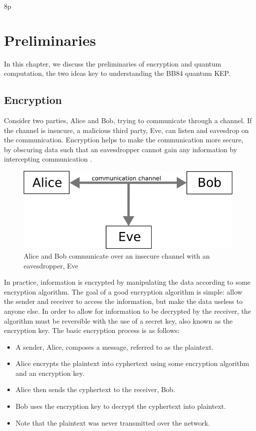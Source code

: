 8p\chapter{Preliminaries}
\label{chap:background}

In this chapter, we discuss the preliminaries of encryption and quantum computation, the two ideas key to understanding the BB84 quantum KEP.


\section{Encryption}
Consider two parties, Alice and Bob, trying to communicate through a channel.
If the channel is insucure, a malicious third party, Eve, can listen and eavesdrop on the communication.
Encryption helps to make the communication more secure, by obscuring data such that an eavesdropper cannot gain any information by intercepting communication \cite{encrypt}.

\begin{figure}[htp]
\centering
\includegraphics[scale=0.4]{images/classical_communication.png}
\caption{Alice and Bob communicate over an insecure channel with an eavesdropper, Eve}
\label{foo bar}
\end{figure}

In practice, information is encrypted by manipulating the data according to some encryption algorithm.
The goal of a good encryption algorithm is simple: allow the sender and receiver to access the information, but make the data useless to anyone else.
In order to allow for information to be decrypted by the receiver, the algorithm must be reversible with the use of a secret key, also known as the encryption key.
The basic encryption process is as follows:

\begin{itemize}
\item A sender, Alice, composes a message, referred to as the plaintext.
\item Alice encrypts the plaintext into cyphertext using some encryption algorithm and an encryption key.
\item Alice then sends the cyphertext to the receiver, Bob.
\item Bob uses the encryption key to decrypt the cyphertext into plaintext.
\item Note that the plaintext was never transmitted over the network.
\end{itemize}

